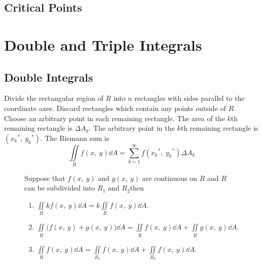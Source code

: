 \documentclass{article}
\begin{document}
\subsection{Critical Points}
\newpage
\section{Double and Triple Integrals}
\subsection{Double Integrals}
\begin{theorem}
    Divide the rectangular region of $R$ into $n$ rectangles with sides
    parallel to the coordinate axes.
    Discard rectangles which contain any points outside of $R$.
    Choose an arbitrary point in each remaining rectangle.
    The area of the $k$th remaining rectangle is $\Delta A_k$.
    The arbitrary point in the $k$th remaining rectangle is
    $({x_k}^\ast,\: {y_k}^\ast)$.
    The Riemann sum is
    \begin{equation*}
        \iint\limits_{R} f(x,\: y)  \dd{A}
        = \sum_{k=1}^{\infty} f({x_k}^\ast,\: {y_k}^\ast) \Delta{}A_k
    \end{equation*}
\end{theorem}
\begin{figure}[H]
	\begin{mdframed}[style=exampledefault,frametitle={Properties of Double Integrals}]
		\begin{theorem}
            Suppose that $f(x,\: y) $ and $g(x,\: y)$ are continuous on $R$
            and $R$ can be subdivided into $R_1$ and $R_2$then
			\begin{enumerate}[label=\normalfont\alph*)]
				\item $\displaystyle\iint\limits_R kf(x,\: y) \dd{A}
                    = k\iint\limits_R f(x,\: y) \dd{A}$.
				\item $\displaystyle\iint\limits_R \bigl(f(x,\: y) + g(x,\: y)\bigr) \dd{A}
                    = \iint\limits_R f(x,\: y) \dd{A} + \iint\limits_R g(x,\: y) \dd{A}$.
                \item $\displaystyle\iint\limits_R f(x,\: y) \dd{A}
                    = \iint\limits_{R_1} f(x,\: y) \dd{A} + \iint\limits_{R_2} f(x,\: y) \dd{A}$.
			\end{enumerate}
		\end{theorem}
	\end{mdframed}
\end{figure}
\end{document}
